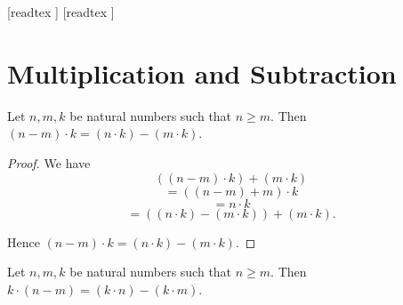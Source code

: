 \documentclass[10pt]{article}
\begin{document}
  \begin{imports}
    \begin{forthel}
      [readtex ]
      [readtex ]
    \end{forthel}
  \end{imports}


  \section*{Multiplication and Subtraction}

  \begin{forthel}
    \begin{proposition}[id=ARITHMETIC_06_5458841930039296,printid]
      Let $n, m, k$ be natural numbers such that $n \geq m$.
      Then $(n - m) \cdot k = (n \cdot k) - (m \cdot k)$.
    \end{proposition}
    \begin{proof}
      We have
      \[  ((n - m) \cdot k) + (m \cdot k)                 \]
      \[    = ((n - m) + m) \cdot k                       \]
      \[    = n \cdot k                                   \]
      \[    = ((n \cdot k) - (m \cdot k)) + (m \cdot k).  \]

      Hence $(n - m) \cdot k = (n \cdot k) - (m \cdot k)$.
    \end{proof}
  \end{forthel}

  \begin{forthel}
    \begin{corollary}[id=ARITHMETIC_06_8461123277815808,printid]
      Let $n, m, k$ be natural numbers such that $n \geq m$.
      Then $k \cdot (n - m) = (k \cdot n) - (k \cdot m)$.
    \end{corollary}
  \end{forthel}
\end{document}
